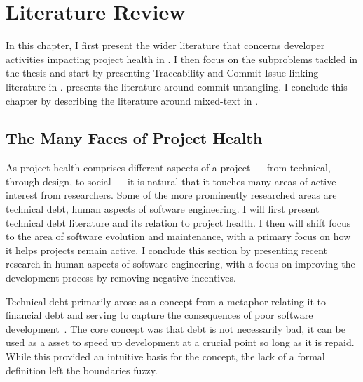 \chapter{Literature Review}
\label{chapter:literature}

In this chapter, I first present the wider literature that concerns developer
activities impacting project health in
. I then focus on the subproblems
tackled in the thesis and start by presenting Traceability and Commit-Issue
linking literature in .
 presents the literature around
commit untangling. I conclude this chapter by describing the literature around
mixed-text in .

\section{The Many Faces of Project Health}
\label{chapter:literature:sec:project_health}

As project health comprises different aspects of a project --- from technical,
through design, to social --- it is natural that it touches many areas of active
interest from researchers. Some of the more prominently researched areas are
technical debt, human aspects of software engineering. I will first present
technical debt literature and its relation to project health. I then will shift
focus to the area of software evolution and maintenance, with a primary focus on
how it helps projects remain active. I conclude this section by presenting
recent research in human aspects of software engineering, with a focus on
improving the development process by removing negative incentives.

Technical debt primarily arose as a concept from a metaphor relating it to
financial debt and serving to capture the consequences of poor software
development~\cite{cunningham1992wycash}. The core concept was that debt is not
necessarily bad, it can be used as a asset to speed up development at a crucial
point so long as it is repaid. While this provided an intuitive basis for the
concept, the lack of a formal definition left the boundaries fuzzy. 

